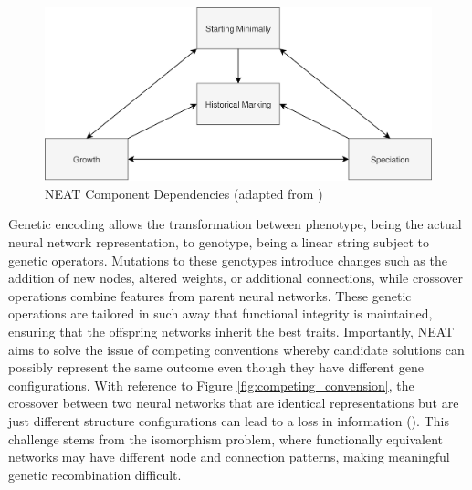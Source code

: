 \parbreak
\begin{figure}[H] %
	\centering %
	\includegraphics[width=\textwidth]{Figures/chapter_ne/ne_neat_components.png} %
	\caption{NEAT Component Dependencies (adapted from \cite{stanley2002evolving})}
	\label{fig:neat_depedencies} %
\end{figure}

\parbreak\noindent Genetic encoding allows the transformation between phenotype, being the actual neural network representation, to genotype, being a linear string subject to genetic operators. Mutations to these genotypes introduce changes such as the addition of new nodes, altered weights, or additional connections, while crossover operations combine features from parent neural networks. These genetic operations are tailored in such away that functional integrity is maintained, ensuring that the offspring networks inherit the best traits. Importantly, NEAT aims to solve the issue of competing conventions whereby candidate solutions can possibly represent the same outcome even though they have different gene configurations. With reference to Figure \ref{fig:competing_convension}, the crossover between two neural networks that are identical representations but are just different structure configurations can lead to a loss in information (\cite{stanley2002evolving}). This challenge stems from the isomorphism problem, where functionally equivalent networks may have different node and connection patterns, making meaningful genetic recombination difficult.


